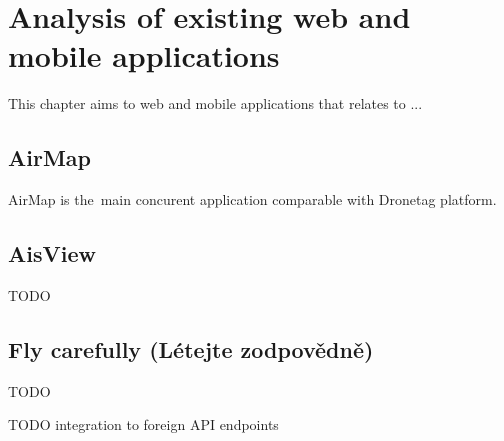 \chapter{Analysis of existing web and mobile applications}\label{ch:analysis-of-existing-web-and-mobile-applications}

This chapter aims to web and mobile applications that relates to ...

\section{AirMap}\label{sec:airmap}
AirMap is the~main concurent application comparable with Dronetag platform.%

\section{AisView}\label{sec:aisview}
TODO

\section{Fly carefully (L{\' e}tejte zodpov{\v e}dn{\v e})}\label{sec:fly-carefully}
TODO


TODO integration to foreign API endpoints

